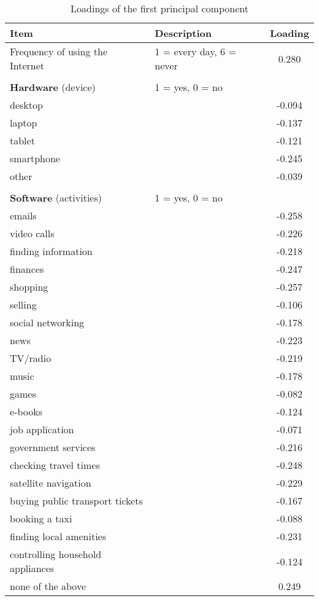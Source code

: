 \documentclass[12pt]{article}
\begin{document}
    \begin{table}[h!]
        \centering
        \caption{Loadings of the first principal component}
        \label{tab:pc1_loadings_q1}
        \begin{tabular}{llc}
            \toprule
            Item & Description & Loading \\
            \midrule
            Frequency of using the Internet & 1 = every day, 6 = never & 0.280 \\
            & & \\
            \textbf{Hardware} (device) & 1 = yes, 0 = no & \\
            desktop &  & -0.094 \\
            laptop &  & -0.137 \\
            tablet &  & -0.121 \\
            smartphone &  & -0.245 \\
            other &  & -0.039 \\
            & & \\
            \textbf{Software} (activities) & 1 = yes, 0 = no & \\
            emails &  & -0.258 \\
            video calls &  & -0.226 \\
            finding information &  & -0.218 \\
            finances &  & -0.247 \\
            shopping &  & -0.257 \\
            selling &  & -0.106 \\
            social networking &  & -0.178 \\
            news &  & -0.223 \\
            TV/radio &  & -0.219 \\
            music &  & -0.178 \\
            games &  & -0.082 \\
            e-books &  & -0.124 \\
            job application &  & -0.071 \\
            government services &  & -0.216 \\
            checking travel times &  & -0.248 \\
            satellite navigation &  & -0.229 \\
            buying public transport tickets &  & -0.167 \\
            booking a taxi &  & -0.088 \\
            finding local amenities &  & -0.231 \\
            controlling household appliances &  & -0.124 \\
            none of the above &  & 0.249 \\
            \bottomrule
        \end{tabular}
    \end{table}
\end{document}
